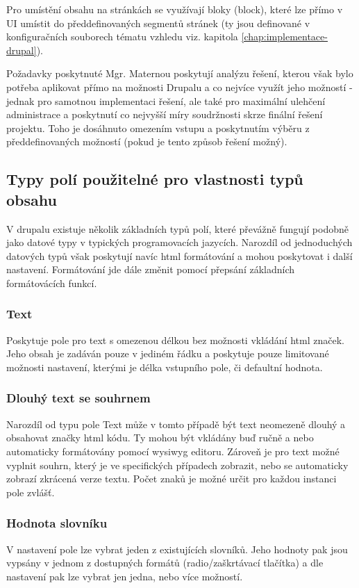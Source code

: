 Pro umístění obsahu na stránkách se využívají bloky (block), které lze přímo v UI umístit do předdefinovaných segmentů stránek (ty jsou definované v konfiguračních souborech tématu vzhledu viz. kapitola \ref{chap:implementace-drupal}).

Požadavky \cite{omaterna2013} poskytnuté Mgr. Maternou poskytují analýzu řešení, kterou však bylo potřeba aplikovat přímo na možnosti Drupalu a co nejvíce využít jeho možností - jednak pro samotnou implementaci řešení, ale také pro maximální ulehčení administrace a poskytnutí co nejvyšší míry soudržnosti skrze finální řešení projektu. Toho je dosáhnuto omezením vstupu a poskytnutím výběru z předdefinovaných možností (pokud je tento způsob řešení možný).

\subsection{Typy polí použitelné pro vlastnosti typů obsahu}
V drupalu existuje několik základních typů polí, které převážně fungují podobně jako datové typy v typických programovacích jazycích. Narozdíl od jednoduchých datových typů však poskytují navíc html formátování a mohou poskytovat i další nastavení. Formátování jde dále změnit pomocí přepsání základních formátovácích funkcí.

\subsubsection*{Text}
Poskytuje pole pro text s omezenou délkou bez možnosti vkládání html značek. Jeho obsah je zadáván pouze v jediném řádku a poskytuje pouze limitované možnosti nastavení, kterými je délka vstupního pole, či defaultní hodnota. 

\subsubsection*{Dlouhý text se souhrnem}
Narozdíl od typu pole Text může v tomto případě být text neomezeně dlouhý a obsahovat značky html kódu. Ty mohou být vkládány buď ručně a nebo automaticky formátovány pomocí \gls{wysiwyg} editoru. Zároveň je pro text možné vyplnit souhrn, který je ve specifických případech zobrazit, nebo se automaticky zobrazí zkrácená verze textu. Počet znaků je možné určit pro každou instanci pole zvlášť.

\subsubsection*{Hodnota slovníku}
V nastavení pole lze vybrat jeden z existujících slovníků. Jeho hodnoty pak jsou vypsány v jednom z dostupných formátů (radio/zaškrtávací tlačítka) a dle nastavení pak lze vybrat jen jedna, nebo více možností.

